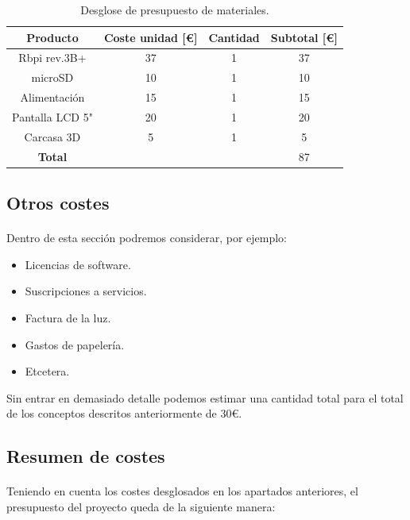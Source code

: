 \begin{table}[hbt]
	\label{t:materialescostes}
	\centering
	\begin{tabular}{|c|c|c|c|}
		\hline
		\textbf{Producto} & \textbf{Coste unidad [\euro]} & \textbf{Cantidad} & \textbf{Subtotal [\euro]} \\
		\hline
		Rbpi rev.3B+ & 37 & 1 & 37 \\
		\hline
		microSD & 10 & 1 & 10 \\
		\hline
        Alimentación & 15 & 1 & 15 \\
		\hline
        Pantalla LCD 5" & 20 & 1 & 20 \\
		\hline
        Carcasa 3D & 5 & 1 & 5 \\
		\hline
		\textbf{Total} & & & 87 \\
		\hline
	\end{tabular}
    \caption{Desglose de presupuesto de materiales.}
\end{table}

\subsection{Otros costes}

\paragraph{}Dentro de esta sección podremos considerar, por ejemplo:

\begin{itemize}
    \item Licencias de software.
    \item Suscripciones a servicios.
    \item Factura de la luz.
    \item Gastos de papelería.
    \item Etcetera.
\end{itemize}

Sin entrar en demasiado detalle podemos estimar una cantidad total para el total de los
conceptos descritos anteriormente de 30\euro.

\subsection{Resumen de costes}

\paragraph{}Teniendo en cuenta los costes desglosados en los apartados anteriores, el
presupuesto del proyecto queda de la siguiente manera:

